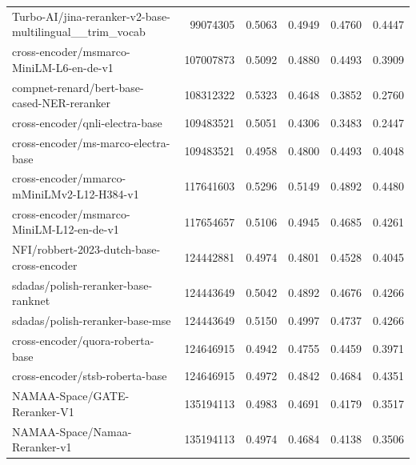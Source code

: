{\begin{xltabular}{\textwidth}{X rrrrr}
      Turbo-AI/jina-reranker-v2-base-multilingual\_\_trim\_vocab             & 99074305      & 0.5063        & 0.4949        & 0.4760        & 0.4447         \\
      cross-encoder/msmarco-MiniLM-L6-en-de-v1                               & 107007873     & 0.5092        & 0.4880        & 0.4493        & 0.3909         \\
      compnet-renard/bert-base-cased-NER-reranker                            & 108312322     & 0.5323        & 0.4648        & 0.3852        & 0.2760         \\
      cross-encoder/qnli-electra-base                                        & 109483521     & 0.5051        & 0.4306        & 0.3483        & 0.2447         \\
      cross-encoder/ms-marco-electra-base                                    & 109483521     & 0.4958        & 0.4800        & 0.4493        & 0.4048         \\
      cross-encoder/mmarco-mMiniLMv2-L12-H384-v1                             & 117641603     & 0.5296        & 0.5149        & 0.4892        & 0.4480         \\
      cross-encoder/msmarco-MiniLM-L12-en-de-v1                              & 117654657     & 0.5106        & 0.4945        & 0.4685        & 0.4261         \\
      NFI/robbert-2023-dutch-base-cross-encoder     & 124442881     & 0.4974        & 0.4801        & 0.4528        & 0.4045         \\
      sdadas/polish-reranker-base-ranknet                                    & 124443649     & 0.5042        & 0.4892        & 0.4676        & 0.4266         \\
      sdadas/polish-reranker-base-mse                                        & 124443649     & 0.5150        & 0.4997        & 0.4737        & 0.4266         \\
      cross-encoder/quora-roberta-base                                       & 124646915     & 0.4942        & 0.4755        & 0.4459        & 0.3971         \\
      cross-encoder/stsb-roberta-base                                        & 124646915     & 0.4972        & 0.4842        & 0.4684        & 0.4351         \\
      NAMAA-Space/GATE-Reranker-V1                                           & 135194113     & 0.4983        & 0.4691        & 0.4179        & 0.3517         \\
      NAMAA-Space/Namaa-Reranker-v1                                          & 135194113     & 0.4974        & 0.4684        & 0.4138        & 0.3506         \\

\end{xltabular}}
